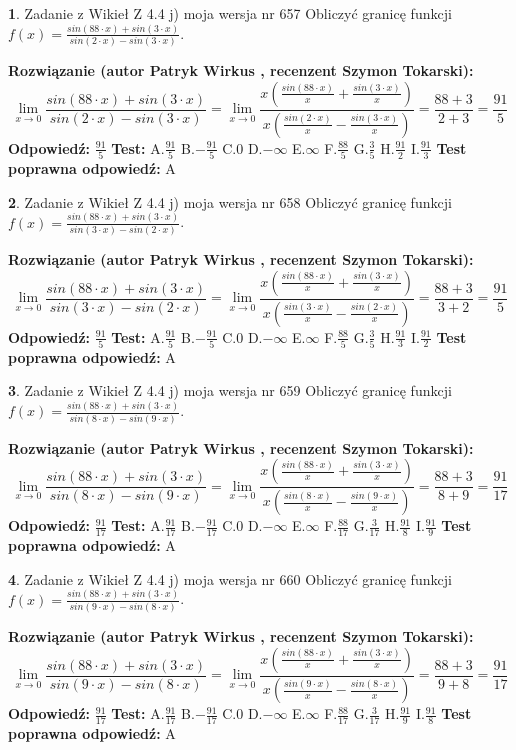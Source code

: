 \documentclass[12pt, a4paper]{article}
\theoremstyle{definition} %
\newtheorem{zad}{}
\newcommand{\zadStart}[1]{\begin{zad}#1\newline}
\newcommand{\zadStop}{\end{zad}}
\newcommand{\rozwStart}[2]{\noindent \textbf{Rozwiązanie (autor #1 , recenzent #2): }\newline}
\newcommand{\rozwStop}{\newline}
\newcommand{\odpStart}{\noindent \textbf{Odpowiedź:}\newline}
\newcommand{\odpStop}{\newline}
\newcommand{\testStart}{\noindent \textbf{Test:}\newline}
\newcommand{\testStop}{\newline}
\newcommand{\kluczStart}{\noindent \textbf{Test poprawna odpowiedź:}\newline}
\newcommand{\kluczStop}{\newline}
\begin{document}
\zadStart{Zadanie z Wikieł Z 4.4 j) moja wersja nr 657}
Obliczyć granicę funkcji $f(x)=\frac{sin(88\cdot x) +sin(3\cdot x)}{sin(2\cdot x) -sin(3\cdot x)}$.
\zadStop
\rozwStart{Patryk Wirkus}{Szymon Tokarski}
$$\lim\limits_{x\to 0}\frac{sin(88\cdot x) +sin(3\cdot x)}{sin(2\cdot x) -sin(3\cdot x)}=\lim\limits_{x\to 0}\frac{x(\frac{sin(88\cdot x)}{x}+\frac{sin(3\cdot x)}{x})}{x(\frac{sin(2\cdot x)}{x}-\frac{sin(3\cdot x)}{x})}=\frac{88+3}{2+3} = \frac{91}{5}$$
\rozwStop
\odpStart
$\frac{91}{5}$
\odpStop
\testStart
A.$\frac{91}{5}$
B.$-\frac{91}{5}$
C.$0$
D.$-\infty$
E.$\infty$
F.$\frac{88}{5}$
G.$\frac{3}{5}$
H.$\frac{91}{2}$
I.$\frac{91}{3}$
\testStop
\kluczStart
A
\kluczStop



\zadStart{Zadanie z Wikieł Z 4.4 j) moja wersja nr 658}
Obliczyć granicę funkcji $f(x)=\frac{sin(88\cdot x) +sin(3\cdot x)}{sin(3\cdot x) -sin(2\cdot x)}$.
\zadStop
\rozwStart{Patryk Wirkus}{Szymon Tokarski}
$$\lim\limits_{x\to 0}\frac{sin(88\cdot x) +sin(3\cdot x)}{sin(3\cdot x) -sin(2\cdot x)}=\lim\limits_{x\to 0}\frac{x(\frac{sin(88\cdot x)}{x}+\frac{sin(3\cdot x)}{x})}{x(\frac{sin(3\cdot x)}{x}-\frac{sin(2\cdot x)}{x})}=\frac{88+3}{3+2} = \frac{91}{5}$$
\rozwStop
\odpStart
$\frac{91}{5}$
\odpStop
\testStart
A.$\frac{91}{5}$
B.$-\frac{91}{5}$
C.$0$
D.$-\infty$
E.$\infty$
F.$\frac{88}{5}$
G.$\frac{3}{5}$
H.$\frac{91}{3}$
I.$\frac{91}{2}$
\testStop
\kluczStart
A
\kluczStop



\zadStart{Zadanie z Wikieł Z 4.4 j) moja wersja nr 659}
Obliczyć granicę funkcji $f(x)=\frac{sin(88\cdot x) +sin(3\cdot x)}{sin(8\cdot x) -sin(9\cdot x)}$.
\zadStop
\rozwStart{Patryk Wirkus}{Szymon Tokarski}
$$\lim\limits_{x\to 0}\frac{sin(88\cdot x) +sin(3\cdot x)}{sin(8\cdot x) -sin(9\cdot x)}=\lim\limits_{x\to 0}\frac{x(\frac{sin(88\cdot x)}{x}+\frac{sin(3\cdot x)}{x})}{x(\frac{sin(8\cdot x)}{x}-\frac{sin(9\cdot x)}{x})}=\frac{88+3}{8+9} = \frac{91}{17}$$
\rozwStop
\odpStart
$\frac{91}{17}$
\odpStop
\testStart
A.$\frac{91}{17}$
B.$-\frac{91}{17}$
C.$0$
D.$-\infty$
E.$\infty$
F.$\frac{88}{17}$
G.$\frac{3}{17}$
H.$\frac{91}{8}$
I.$\frac{91}{9}$
\testStop
\kluczStart
A
\kluczStop



\zadStart{Zadanie z Wikieł Z 4.4 j) moja wersja nr 660}
Obliczyć granicę funkcji $f(x)=\frac{sin(88\cdot x) +sin(3\cdot x)}{sin(9\cdot x) -sin(8\cdot x)}$.
\zadStop
\rozwStart{Patryk Wirkus}{Szymon Tokarski}
$$\lim\limits_{x\to 0}\frac{sin(88\cdot x) +sin(3\cdot x)}{sin(9\cdot x) -sin(8\cdot x)}=\lim\limits_{x\to 0}\frac{x(\frac{sin(88\cdot x)}{x}+\frac{sin(3\cdot x)}{x})}{x(\frac{sin(9\cdot x)}{x}-\frac{sin(8\cdot x)}{x})}=\frac{88+3}{9+8} = \frac{91}{17}$$
\rozwStop
\odpStart
$\frac{91}{17}$
\odpStop
\testStart
A.$\frac{91}{17}$
B.$-\frac{91}{17}$
C.$0$
D.$-\infty$
E.$\infty$
F.$\frac{88}{17}$
G.$\frac{3}{17}$
H.$\frac{91}{9}$
I.$\frac{91}{8}$
\testStop
\kluczStart
A
\kluczStop
\end{document}
